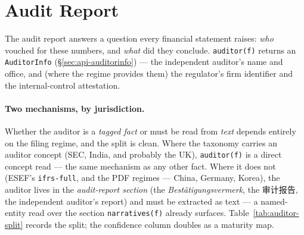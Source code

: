 \documentclass[11pt,a4paper]{report}
\newcommand{\cncjk}[2]{{\cjkCNfont #1}}
\begin{document}
\section{Audit Report}
\label{sec:audit-report}

The audit report answers a question every financial statement raises: \emph{who} vouched for these numbers,
and \emph{what} did they conclude. \texttt{auditor(f)} returns an \texttt{AuditorInfo} (\S\ref{sec:api-auditorinfo}) --- the independent
auditor's name and office, and (where the regime provides them) the regulator's firm identifier and the
internal-control attestation.

\paragraph{Two mechanisms, by jurisdiction.} Whether the auditor is a \emph{tagged fact} or must be read
from \emph{text} depends entirely on the filing regime, and the split is clean. Where the taxonomy carries
an auditor concept (SEC, India, and probably the UK), \texttt{auditor(f)} is a direct concept read --- the
same mechanism as any other fact. Where it does not (ESEF's \texttt{ifrs-full}, and the PDF regimes ---
China, Germany, Korea), the auditor lives in the \emph{audit-report section} (the
\emph{Bestätigungsvermerk}, the \cncjk{审计报告}{}, the independent auditor's report) and must be extracted
as text --- a named-entity read over the section \texttt{narratives(f)} already surfaces. Table~\ref{tab:auditor-split}
records the split; the confidence column doubles as a maturity map.
\end{document}
